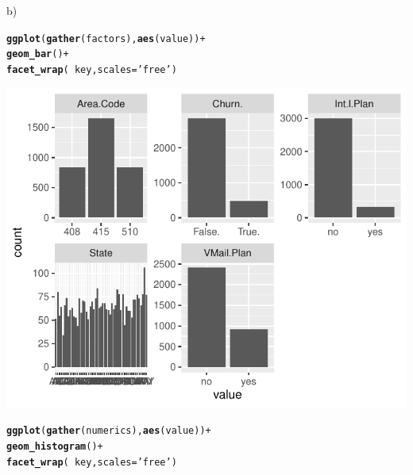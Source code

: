 \documentclass{article}\usepackage[]{graphicx}\usepackage[]{color}
\makeatletter
\def\maxwidth{ %
  \ifdim\Gin@nat@width>\linewidth
    \linewidth
  \else
    \Gin@nat@width
  \fi
}
\newcommand{\hlstr}[1]{\textcolor[rgb]{0.192,0.494,0.8}{#1}}%
\newcommand{\hlopt}[1]{\textcolor[rgb]{0,0,0}{#1}}%
\newcommand{\hlstd}[1]{\textcolor[rgb]{0.345,0.345,0.345}{#1}}%
\newcommand{\hlkwc}[1]{\textcolor[rgb]{0.333,0.667,0.333}{#1}}%
\newcommand{\hlkwd}[1]{\textcolor[rgb]{0.737,0.353,0.396}{\textbf{#1}}}%
\newenvironment{kframe}{%
 \def\at@end@of@kframe{}%
 \ifinner\ifhmode%
  \def\at@end@of@kframe{\end{minipage}}%
  \begin{minipage}{\columnwidth}%
 \fi\fi%
 \def\FrameCommand##1{\hskip\@totalleftmargin \hskip-\fboxsep
 \colorbox{shadecolor}{##1}\hskip-\fboxsep
     \hskip-\linewidth \hskip-\@totalleftmargin \hskip\columnwidth}%
 \MakeFramed {\advance\hsize-\width
   \@totalleftmargin\z@ \linewidth\hsize
   \@setminipage}}%
 {\par\unskip\endMakeFramed%
 \at@end@of@kframe}
\newenvironment{knitrout}{}{} %
\makeatother
\begin{document}
\begin{description}
\item{b)}

\begin{knitrout}
\color{fgcolor}\begin{kframe}
\begin{alltt}
\hlkwd{ggplot}\hlstd{(}\hlkwd{gather}\hlstd{(factors),} \hlkwd{aes}\hlstd{(value))} \hlopt{+}
  \hlkwd{geom_bar}\hlstd{()} \hlopt{+}
  \hlkwd{facet_wrap}\hlstd{(}\hlopt{~}\hlstd{key,} \hlkwc{scales}\hlstd{=}\hlstr{'free'}\hlstd{)}
\end{alltt}
\end{kframe}

{\centering \includegraphics[width=\maxwidth]{figure/Overviews_plots-1} 

}


\begin{kframe}\begin{alltt}
\hlkwd{ggplot}\hlstd{(}\hlkwd{gather}\hlstd{(numerics),} \hlkwd{aes}\hlstd{(value))} \hlopt{+}
  \hlkwd{geom_histogram}\hlstd{()} \hlopt{+}
  \hlkwd{facet_wrap}\hlstd{(}\hlopt{~}\hlstd{key,} \hlkwc{scales}\hlstd{=}\hlstr{'free'}\hlstd{)}
\end{alltt}
\end{kframe}


\end{knitrout}
\end{description}
\end{document}
